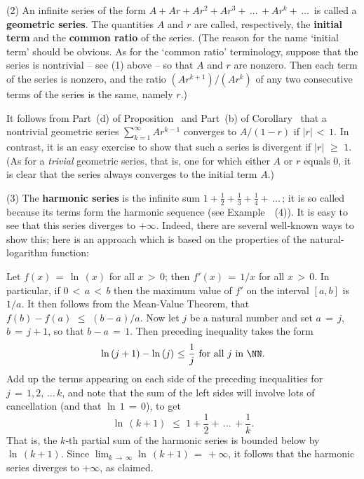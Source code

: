 \V

        (2) An infinite series of the form $A+Ar+Ar^{2}+Ar^{3}+\,{\ldots}\,+Ar^{k}+\,{\ldots}\,$ is called a {\bf geometric series}.
    The quantities $A$ and $r$ are called, respectively, the {\bf initial term} and the {\bf common ratio} of the series.
    (The reason for the name `initial term' should be obvious. As for the `common ratio' terminology,
    suppose that the series is nontrivial -- see (1) above --  so that $A$ and $r$ are nonzero.
    Then each term of the series is nonzero, and the ratio $(Ar^{k+1})/(Ar^{k})$ of any two consecutive terms of the series is the same, namely $r$.)

       It follows from Part~(d) of Proposition~ and Part~(b) of Corollary~ that a nontrivial geometric series $\sum_{k=1}^{{\infty}} Ar^{k-1}$ converges to $A/(1-r)$ if $|r|\,<\,1$.
    In contrast, it is an easy exercise to show that such a series is divergent if $|r|\,\,{\geq}\,\,1$.
    (As for a {\em trivial} geometric series, that is, one for which either $A$ or $r$ equals $0$,
    it is clear that the series always converges to the initial term $A$.)

\V

        (3) The {\bf harmonic series} is the infinite sum ${\displaystyle 1+\frac{1}{2}+\frac{1}{3} + \frac{1}{4}+ \,{\ldots}\,}$;
    it is so called because its terms form the harmonic sequence (see Example~~(4)).
    It is easy to see that this series diverges to $+{\infty}$. Indeed, there are several well-known ways to show this;
    here is an approach which is based on the properties of the natural-logarithm function:

       Let $f(x) \,=\, {\ln}\,(x)$ for all $x\,>\,0$; then $f'(x) \,=\, 1/x$ for all $x\,>\,0$.
    In particular, if $0\,<\,a\,<\,b$ then the maximum value of $f'$ on the interval $[a,b]$ is $1/a$.
    It then follows from the Mean-Value Theorem, that $f(b) - f(a)\,\,{\leq}\,\,(b-a)/a$.
    Now let $j$ be a natural number and set $a \,=\, j$, $b \,=\, j+1$, so that $b-a \,=\, 1$. Then preceding inequality takes the form
        \begin{displaymath}
        {\ln}\,(j+1) - {\ln}\,(j)\,\,{\leq}\,\,\frac{1}{j} \mbox{ for all $j$ in ${\NN}$}.
        \end{displaymath}
    Add up the terms appearing on each side of the preceding inequalities for $j \,=\, 1,2,\,{\ldots}\,k$,
    and note that the sum of the left sides will involve lots of cancellation (and that ${\ln}\,1 \,=\, 0$), to get
        \begin{displaymath}
        {\ln}\,(k+1)\,\,{\leq}\,\,1+\frac{1}{2} + \,{\ldots}\, + \frac{1}{k}.
        \end{displaymath}
    That is, the $k$-th partial sum of the harmonic series is bounded below by ${\ln}\,(k+1)$.
    Since $\lim_{k \,{\rightarrow}\, {\infty}} {\ln}\,(k+1) \,=\, +{\infty}$, it follows that the harmonic series diverges to $+{\infty}$, as claimed.

